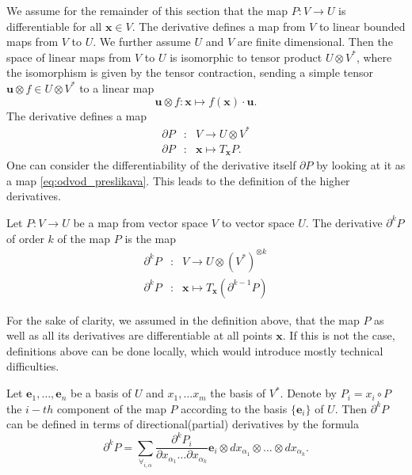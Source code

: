 \documentclass[11pt]{article}
\newcommand{\e}{\mathbf{e}}
\newcommand{\x}{\mathbf{x}}
\newcommand{\uu}{\mathbf{u}}
\newcommand{\D}{\partial}
\begin{document}
We assume for the remainder of this section that the map $P:V\to U$ is
differentiable for all $\x\in V$. The derivative defines a map from $V$ to
linear bounded maps from $V$ to $U$. We further assume $U$ and $V$ are finite
dimensional. Then the space of linear maps from $V$ to $U$ is isomorphic to
tensor product $U\otimes V^*$, where the isomorphism is given by the
tensor contraction, sending a simple tensor $\uu\otimes f\in U\otimes
V^*$ to a linear map
 \begin{equation}
   \label{eq:lin_tenzor}
   \uu\otimes f:\x \mapsto f(\x)\cdot \uu.
 \end{equation}
The derivative defines a map
\begin{eqnarray}
  \label{eq:odvod_preslikava}
  \D P&:& V\to U\otimes V^*\\
  \D P&:& \x \mapsto T_\x P.
\end{eqnarray}
One can consider the differentiability of the derivative itself $\D P$ by
looking at it as a map \eqref{eq:odvod_preslikava}. This leads to the definition
of the higher derivatives.
\begin{definition}
  \label{def:higher_derivatives}
  Let $P:V\to U$ be a map from vector space $V$ to vector space $U$. 
The derivative $\D^k P$ of order $k$ of the map $P$ is the map
\begin{eqnarray}\label{eq:partial}
    \label{eq:visji_odvod}
    \D^kP&:&V\to U\otimes (V^*)^{\otimes k}\\
    \D^kP&:&\x\mapsto T_\x\left( \D^{k-1}P \right)
  \end{eqnarray}
\end{definition} 
\begin{remark}
  For the sake of clarity, we assumed in the definition above, that the map $P$
  as well as all its derivatives are differentiable at all points $\x$. If this
  is not the case, 
  definitions above can be done locally, which would introduce mostly technical
  difficulties. 
\end{remark}
Let $\e_1,\ldots,\e_n$ be a basis of $U$ and $x_1,\ldots x_m$ the basis of
$V^*$. Denote by $P_i=x_i\circ P$ the $i-th$ component of the map
$P$ according to the basis $\{\e_i\}$ of $U$.
Then $\D^kP$  can be defined in terms of
directional(partial) derivatives by the formula
\begin{equation}\label{eq:d}
	\partial^kP=\sum_{\forall_{i,\alpha}}\frac{\partial^k P_i}{\partial
	    x_{\alpha_1}\ldots \partial x_{\alpha_k}}\e_i\otimes
	  dx_{\alpha_1}\otimes\ldots \otimes dx_{\alpha_k}.
\end{equation}
\end{document}
